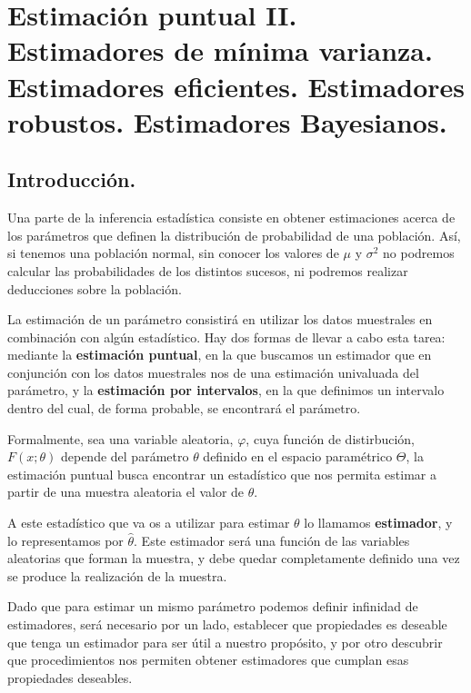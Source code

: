\chapter[Estimaci\'on puntual II.]{Estimaci\'on puntual II. \\
\normalsize Estimadores de m\'inima varianza. Estimadores eficientes. Estimadores robustos. Estimadores Bayesianos.}

\section{Introducci\'on.}

Una parte de la inferencia estad\'istica consiste en obtener estimaciones acerca de los par\'ametros que definen la distribuci\'on de probabilidad de una poblaci\'on. As\'i, si tenemos una poblaci\'on normal, sin conocer los valores de $\mu$ y $\sigma^2$ no podremos calcular las probabilidades de los distintos sucesos, ni podremos realizar deducciones sobre la poblaci\'on.

La estimaci\'on de un par\'ametro consistir\'a en utilizar los datos muestrales en combinaci\'on con alg\'un estad\'istico. Hay dos formas de llevar a cabo esta tarea: mediante la \textbf{estimaci\'on puntual}, en la que buscamos un estimador que en conjunci\'on con los datos muestrales nos de una estimaci\'on univaluada del par\'ametro, y la \textbf{estimaci\'on por intervalos}, en la que definimos un intervalo dentro del cual, de forma probable, se encontrar\'a el par\'ametro.

Formalmente, sea una variable aleatoria, $\varphi$, cuya funci\'on de distirbuci\'on, $F(x;\theta)$ depende del par\'ametro $\theta$ definido en el espacio param\'etrico $\Theta$, la estimaci\'on puntual busca encontrar un estad\'istico que nos permita estimar a partir de una muestra aleatoria el valor de $\theta$.

A este estad\'istico que va os a utilizar para estimar $\theta$ lo llamamos \textbf{estimador}, y lo representamos por $\hat{\theta}$. Este estimador ser\'a una funci\'on de las variables aleatorias que forman la muestra, y debe quedar completamente definido una vez se produce la realizaci\'on de la muestra.

Dado que para estimar un mismo par\'ametro podemos definir infinidad de estimadores, ser\'a necesario por un lado, establecer que propiedades es deseable que tenga un estimador para ser \'util a nuestro prop\'osito, y por otro descubrir que procedimientos nos permiten obtener estimadores que cumplan esas propiedades deseables.

